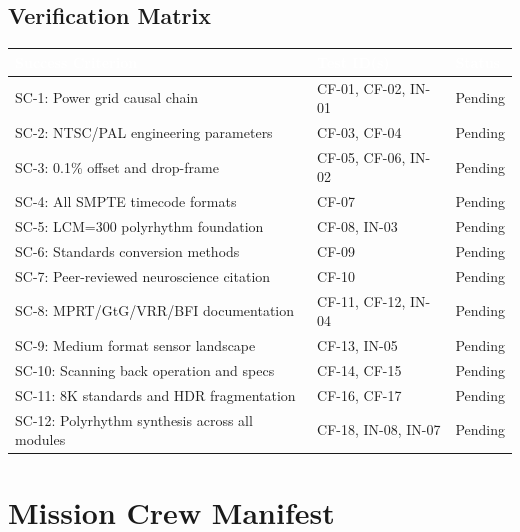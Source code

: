\documentclass[11pt,letterpaper]{article}
\newcommand{\tableheader}[1]{\textbf{\sffamily\textcolor{white}{#1}}}
\begin{document}
\subsection{Verification Matrix}

\begin{center}
\begin{tabularx}{\textwidth}{XL{3.5cm}C{1.5cm}}
\toprule
{}
\tableheader{Success Criterion} & \tableheader{Test ID(s)} & \tableheader{Status} \\
\midrule
SC-1: Power grid causal chain & CF-01, CF-02, IN-01 & Pending \\
SC-2: NTSC/PAL engineering parameters & CF-03, CF-04 & Pending \\
SC-3: 0.1\% offset and drop-frame & CF-05, CF-06, IN-02 & Pending \\
SC-4: All SMPTE timecode formats & CF-07 & Pending \\
SC-5: LCM=300 polyrhythm foundation & CF-08, IN-03 & Pending \\
SC-6: Standards conversion methods & CF-09 & Pending \\
SC-7: Peer-reviewed neuroscience citation & CF-10 & Pending \\
SC-8: MPRT/GtG/VRR/BFI documentation & CF-11, CF-12, IN-04 & Pending \\
SC-9: Medium format sensor landscape & CF-13, IN-05 & Pending \\
SC-10: Scanning back operation and specs & CF-14, CF-15 & Pending \\
SC-11: 8K standards and HDR fragmentation & CF-16, CF-17 & Pending \\
SC-12: Polyrhythm synthesis across all modules & CF-18, IN-08, IN-07 & Pending \\
\bottomrule
\end{tabularx}
\end{center}

\section{Mission Crew Manifest}
\end{document}
